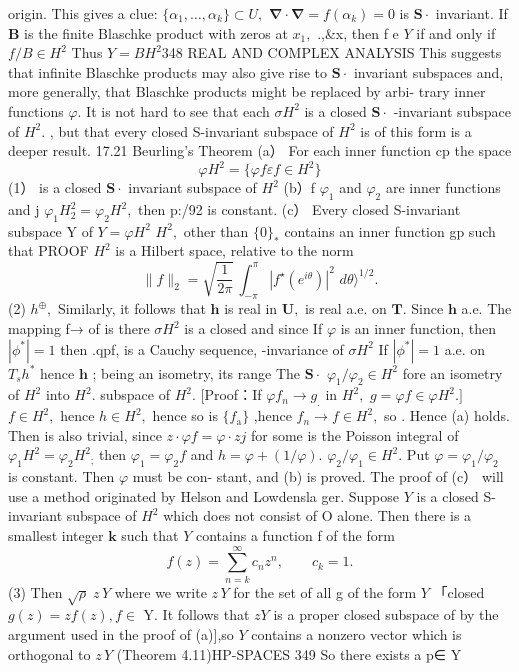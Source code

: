 origin. This gives a clue: $\{\alpha_{1},\ldots,\alpha_{k}\}\subset U,$ $\mathbf{\nabla}\cdot\mathbf{\nabla}=f(\alpha_{k})=0$ is ${\boldsymbol{S}}\cdot$ invariant. If $\boldsymbol{B}$ is the finite Blaschke product with zeros at $x_{1},$ .,&x, then f e ${\mathbf{}}Y$ if and only if $f/B\in H^{2}$ Thus $Y=B H^{2}$348 REAL AND COMPLEX ANALYSIS This suggests that infinite Blaschke products may also give rise to ${\boldsymbol{S}}\cdot$ invariant subspaces and, more generally, that Blaschke products might be replaced by arbi- trary inner functions $\varphi.$ It is not hard to see that each $\scriptstyle{\sigma H^{2}}$ is a closed ${\boldsymbol{S}}\cdot$ -invariant subspace of $H^{2}.$ , but that every closed S-invariant subspace of $H^{2}$ is of this form is a deeper result. 17.21 Beurling's Theorem (a） For each inner function cp the space $$ \varphi H^{2}=\{\varphi f\varepsilon f\in H^{2}\} $$ (1） is a closed ${\boldsymbol{S}}\cdot$ invariant subspace of $H^{2}$ (b）f $\varphi_{1}$ and $\varphi_{2}$ are inner functions and j $\varphi_{1}H_{2}^{2}=\varphi_{2}H^{2},$ then p:/92 is constant. (c） Every closed S-invariant subspace Y of $Y=\varphi H^{2}$ $H^{2},$ other than $\{0\}_{*}$ contains an inner function gp such that PROOF $H^{2}$ is a Hilbert space, relative to the norm $$ \|f\|_{2}=\sqrt{\frac{1}{2\pi}}\,\int_{-\pi}^{\pi}|f^{\star}(e^{i\theta})|^{2}\,\,d\theta\rangle^{1/2}. $$ (2) $h^{\oplus},$ Similarly, it follows that ${\boldsymbol{h}}$ is real in ${\boldsymbol{U}},$ is real a.e. on ${\boldsymbol{T}}.$ Since $\boldsymbol{h}$ a.e. The mapping f→ of is there $\scriptstyle{\sigma H^{2}}$ is a closed and since If $\varphi$ is an inner function, then $|\phi^{*}|=1$ then .{qpf,} is a Cauchy sequence, -invariance of $\scriptstyle{\sigma H^{2}}$ If $|\phi^{*}|=1$ a.e. on $\scriptstyle{T_{s}h^{\ast}}$ hence ${\boldsymbol{h}}$ ; being an isometry, its range The ${\boldsymbol{S}}\cdot$ $\varphi_{1}/\varphi_{2}\in H^{2}$ fore an isometry of $H^{2}$ into $H^{2}.$ subspace of $H^{2}.$ [Proof：If $\varphi f_{n}\to g_{.}$ in $H^{2},$ $g=\varphi f\in\varphi H^{2}.]$ $f\in H^{2},$ hence $h\in H^{2},$ hence so is $\scriptstyle\{f_{\mathrm{a}}\}$ ,hence $f_{n}\to f\in H^{2},$ so . Hence (a) holds. Then is also trivial, since $z\cdot\varphi f=\varphi\cdot z j$ for some is the Poisson integral of $\varphi_{1}H^{2}=\varphi_{2}H_{\;\;;}^{2}$ then $\varphi_{1}=\varphi_{2}f$ and $h=\varphi+(1/\varphi).$ $\varphi_{2}/\varphi_{1}\in H^{2}.$ Put $\varphi=\varphi_{1}/\varphi_{2}$ is constant. Then $\varphi$ must be con- stant, and (b) is proved. The proof of (c） will use a method originated by Helson and Lowdensla ger. Suppose ${\mathbf{}}Y$ is a closed S-invariant subspace of $H^{2}$ which does not consist of O alone. Then there is a smallest integer $\boldsymbol{k}$ such that ${\mathbf{}}Y$ contains a function f of the form $$ f(z)=\sum_{n=k}^{\infty}c_{n}z^{n},\qquad c_{k}=1. $$ (3) Then $\scriptstyle{\sqrt{\rho}}\;z\,Y$ where we write $z\,Y$ for the set of all g of the form ${\mathbf{}}Y$ 「closed $g(z)=z f(z),f\in$ Y. It follows that $z Y$ is a proper closed subspace of by the argument used in the proof of (a)],so ${\mathbf{}}Y$ contains a nonzero vector which is orthogonal to $z\,Y$ (Theorem 4.11)HP-SPACES 349 So there exists a p∈ Y 